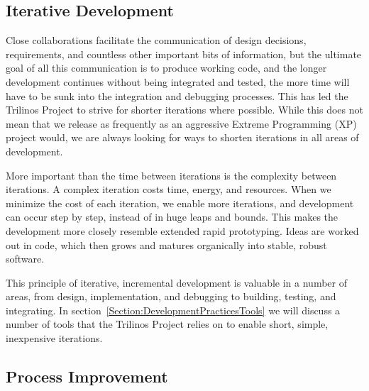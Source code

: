 \documentclass[times,10pt,twocolumn]{article}
\begin{document}
\subsection{Iterative Development}

Close collaborations facilitate the communication of design
decisions, requirements, and countless other important bits of
information, but the ultimate goal of all this communication is to
produce working code, and the longer development continues without
being integrated and tested, the more time will have to be sunk into
the integration and debugging processes.  This has led the Trilinos
Project to strive for shorter iterations where possible. While this
does not mean that we release as frequently as an aggressive Extreme
Programming (XP)~\cite{XP} project would, we are always looking for
ways to shorten iterations in all areas of development.

More important than the time between iterations is the complexity
between iterations.  A complex iteration costs time, energy, and
resources.  When we minimize the cost of each iteration, we enable
more iterations, and development can occur step by step, instead of
in huge leaps and bounds.  This makes the development more closely
resemble extended rapid prototyping.  Ideas are worked out in code,
which then grows and matures organically into stable, robust
software.

This principle of iterative, incremental development is valuable in
a number of areas, from design, implementation, and debugging to
building, testing, and integrating.  In
section~\ref{Section:DevelopmentPracticesTools} we will discuss a
number of tools that the Trilinos Project relies on to enable short,
simple, inexpensive iterations.

\subsection{Process Improvement}
\end{document}
